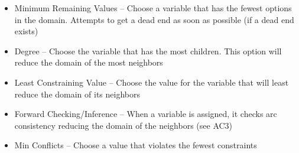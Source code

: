 \documentclass{article}
\begin{document}
\begin{itemize}
\begin{itemize}
		\item Minimum Remaining Values -- Choose a variable that has the fewest options in the domain. Attempts to get a dead end as soon as possible (if a dead end exists)
		\item Degree -- Choose the variable that has the most children. This option will reduce the domain of the most neighbors
		\item Least Constraining Value -- Choose the value for the variable that will least reduce the domain of its neighbors
		\item Forward Checking/Inference -- When a variable is assigned, it checks arc consistency reducing the domain of the neighbors (see AC3)
		\item Min Conflicts -- Choose a value that violates the fewest constraints
	\end{itemize}
\end{itemize}
\end{document}
